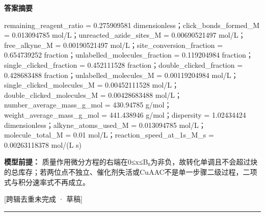\documentclass[UTF8,11pt,a4paper]{ctexart}
\begin{document}
\noindent\textbf{答案摘要}\par
remaining\_reagent\_ratio = 0.275909581 dimensionless；click\_bonds\_formed\_M = 0.013094785 mol/L；unreacted\_azide\_sites\_M = 0.00690521497 mol/L；free\_alkyne\_M = 0.00190521497 mol/L；site\_conversion\_fraction = 0.654739252 fraction；unlabelled\_molecules\_fraction = 0.119204984 fraction；single\_clicked\_fraction = 0.452111528 fraction；double\_clicked\_fraction = 0.428683488 fraction；unlabelled\_molecules\_M = 0.00119204984 mol/L；single\_clicked\_molecules\_M = 0.00452111528 mol/L；double\_clicked\_molecules\_M = 0.00428683488 mol/L；number\_average\_mass\_g\_mol = 430.94785 g/mol；weight\_average\_mass\_g\_mol = 441.438946 g/mol；dispersity = 1.02434424 dimensionless；alkyne\_atoms\_used\_M = 0.013094785 mol/L；molecule\_total\_M = 0.01 mol/L；reaction\_speed\_at\_1s\_M\_s = 0.00263118378 mol/(L s)\par
\noindent\textbf{模型前提：}
质量作用微分方程的右端在0≤x≤B₀为非负，故转化单调且不会超过炔的总库存；若两位点不独立、催化剂失活或CuAAC不是单一步骤二级过程，二项式与积分速率式不再成立。\par
\noindent\textcolor{red!65!black}{[跨辑去重未完成 · 草稿]} \par
\medskip\hrule\medskip
{}
\end{document}
